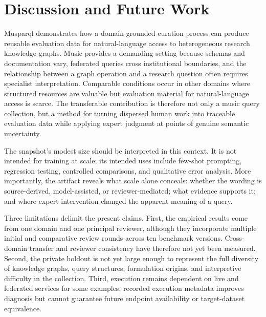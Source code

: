 \section{Discussion and Future Work}\label{discussion-and-future-work}

Musparql demonstrates how a domain-grounded curation process can produce reusable evaluation data for natural-language access to heterogeneous research knowledge graphs. Music provides a demanding setting because schemas and documentation vary, federated queries cross institutional boundaries, and the relationship between a graph operation and a research question often requires specialist interpretation. Comparable conditions occur in other domains where structured resources are valuable but evaluation material for natural-language access is scarce. The transferable contribution is therefore not only a music query collection, but a method for turning dispersed human work into traceable evaluation data while applying expert judgment at points of genuine semantic uncertainty.

The snapshot's modest size should be interpreted in this context. It is not intended for training at scale; its intended uses include few-shot prompting, regression testing, controlled comparisons, and qualitative error analysis. More importantly, the artifact reveals what scale alone conceals: whether the wording is source-derived, model-assisted, or reviewer-mediated; what evidence supports it; and where expert intervention changed the apparent meaning of a query.

Three limitations delimit the present claims. First, the empirical results come from one domain and one principal reviewer, although they incorporate multiple initial and comparative review rounds across ten benchmark versions. Cross-domain transfer and reviewer consistency have therefore not yet been measured. Second, the private holdout is not yet large enough to represent the full diversity of knowledge graphs, query structures, formulation origins, and interpretive difficulty in the collection. Third, execution remains dependent on live and federated services for some examples; recorded execution metadata improves diagnosis but cannot guarantee future endpoint availability or target-dataset equivalence.

